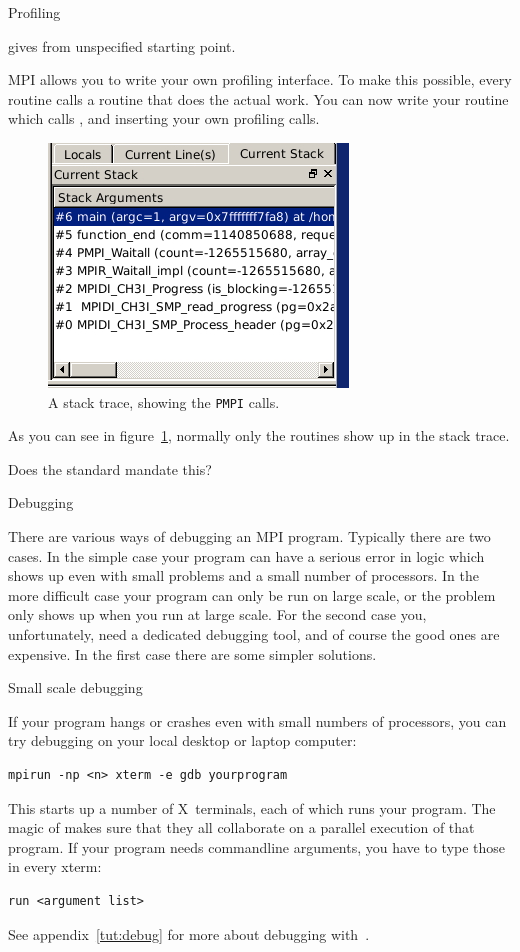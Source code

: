  {Profiling}
\label{sec:profile}

 gives  from
unspecified starting point.

MPI allows you to write your own profiling interface. To make this possible,
every routine  calls a routine  that 
does the actual work. You can now write your  routine
which calls , and inserting your own profiling calls.
\begin{figure}
  \includegraphics[scale=.7]{graphics-public/pmpi}
  \caption{A stack trace, showing the \texttt{PMPI} calls.}
  \label{fig:pmpi}
\end{figure}
As you can see in figure~\ref{fig:pmpi}, normally only the  routines
show up in the stack trace.

Does the standard mandate this?

 {Debugging}
\label{sec:debug}

There are various ways of debugging an MPI program. Typically there
are two cases. In the simple case your program can have a serious
error in logic which shows up even with small problems and a small
number of processors. In the more difficult case your program can only
be run on large scale, or the problem only shows up when you run at
large scale. For the second case you, unfortunately, need a dedicated
debugging tool, and of course the good ones are expensive. In the
first case there are some simpler solutions.

 {Small scale debugging}

If your program hangs or crashes even with small numbers of
processors, you can try debugging on your local desktop or laptop
computer:
\begin{verbatim}
mpirun -np <n> xterm -e gdb yourprogram
\end{verbatim}
This starts up a number of X~terminals, each of which runs your
program. The magic of  makes sure that they all collaborate
on a parallel execution of that program. If your program needs
commandline arguments, you have to type those in every xterm:
\begin{verbatim}
run <argument list>
\end{verbatim}
See appendix~\ref{tut:debug} for more about debugging with~.

